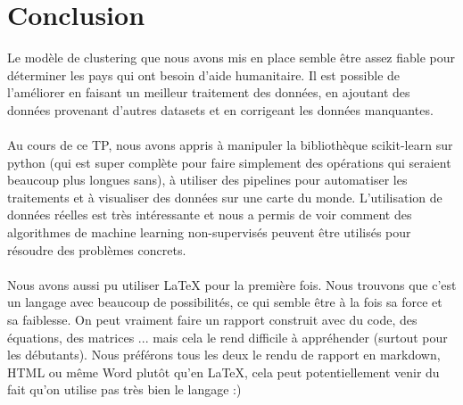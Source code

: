 \documentclass{article}
\begin{document}
\newpage
\section{Conclusion}

\noindent Le modèle de clustering que nous avons mis en place semble être assez fiable pour déterminer les pays qui ont besoin d’aide humanitaire. Il est possible de l’améliorer en faisant un meilleur traitement des données, en ajoutant des données provenant d'autres datasets et en corrigeant les données manquantes. \\ \\
Au cours de ce TP, nous avons appris à manipuler la bibliothèque scikit-learn sur python (qui est super complète pour faire simplement des opérations qui seraient beaucoup plus longues sans), à utiliser des pipelines pour automatiser les traitements et à visualiser des données sur une carte du monde. L'utilisation de données réelles est très intéressante et nous a permis de voir comment des algorithmes de machine learning non-supervisés peuvent être utilisés pour résoudre des problèmes concrets.
\\ \\
Nous avons aussi pu utiliser LaTeX pour la première fois. Nous trouvons que c'est un langage avec beaucoup de possibilités, ce qui semble être à la fois sa force et sa faiblesse. On peut vraiment faire un rapport construit avec du code, des équations, des matrices ... mais cela le rend difficile à appréhender (surtout pour les débutants). Nous préférons tous les deux le rendu de rapport en markdown, HTML ou même Word plutôt qu'en LaTeX, cela peut potentiellement venir du fait qu'on utilise pas très bien le langage :)
\end{document}
